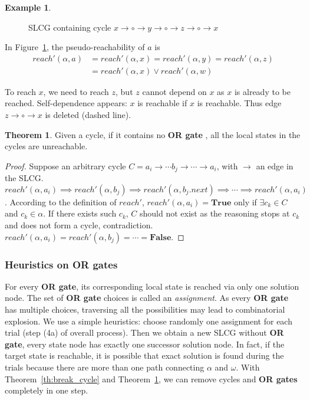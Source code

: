 \documentclass{article}
\theoremstyle{definition}
\newtheorem{theorem}{Theorem}
\newtheorem{example}{Example}
\begin{document}
\begin{example}
    \begin{figure}[H]
        \centering
        
        \caption{SLCG containing cycle $x\to \circ \to y \to \circ \to z\to \circ \to x$}
        \label{cycle1}
    \end{figure}
    
    In Figure~\ref{cycle1}, the pseudo-reachability of $a$ is 
    \begin{align*}
        reach'(\alpha,a)&=reach'(\alpha,x)=reach'(\alpha,y)=reach'(\alpha,z)\\
        &=reach'(\alpha,x)\lor reach'(\alpha,w)
    \end{align*}
    
    To reach $x$, we need to reach $z$, but $z$ cannot depend on $x$ as $x$ is already to be reached. 
    Self-dependence appears: $x$ is reachable if $x$ is reachable.
    Thus edge $z\to \circ \to x$ is deleted (dashed line).
\end{example}

\begin{theorem}\label{th:break_cycle2}
Given a cycle, if it contains no \textbf{OR gate}%
, all the local states in the cycles are unreachable.
\end{theorem}

\begin{proof}
Suppose an arbitrary cycle $C=a_i\to \cdots b_j\to\cdots \to a_i$, with $\to$ an edge in the SLCG.
$reach'(\alpha,a_i)\implies reach'(\alpha,b_j)\implies reach'(\alpha,b_j.next)\implies \cdots\implies reach'(\alpha,a_i)$.
According to the definition of $reach'$, $reach'(\alpha,a_i)=\mathbf{True}$ only if $\exists c_k\in C$ and $c_k\in \alpha$.
If there exists such $c_k$, $C$ should not exist as the reasoning stops at $c_k$ and does not form a cycle, contradiction.
$reach'(\alpha,a_i)=reach'(\alpha,b_j)=\cdots =\mathbf{False}$.
\end{proof}

\subsubsection{Heuristics on OR gates}\label{sec:OR}
For every \textbf{OR gate}, its corresponding local state is reached via only one solution node.
The set of \textbf{OR gate} choices is called an \textit{assignment}.
As every \textbf{OR gate} has multiple choices, traversing all the possibilities may lead to combinatorial explosion.
We use a simple heuristics: 
choose randomly one assignment for each trial (step (4a) of overall process).
Then we obtain a new SLCG without \textbf{OR gate}, every state node has exactly one successor solution node.
In fact, if the target state is reachable, it is possible that exact solution is found during the trials because there are more than one path connecting $\alpha$ and $\omega$.
With Theorem~\ref{th:break_cycle} and Theorem~\ref{th:break_cycle2}, we can remove cycles and \textbf{OR gates} completely in one step.
\end{document}
